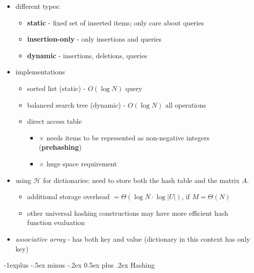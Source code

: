 \documentclass[10pt, landscape]{article}
\makeatletter
\renewcommand{\subsection}{\@startsection{subsection}{2}{0mm}%
  {-1explus -.5ex minus -.2ex}%
  {0.5ex plus .2ex}%
{\normalfont\normalsize\bfseries}}
\makeatother
\begin{document}
\begin{multicols*}{4}
  \begin{itemize}
    \item different types:
      \begin{itemize}
        \item \textbf{static} - fixed set of inserted items; only care about queries
        \item \textbf{insertion-only} - only insertions and queries
        \item \textbf{dynamic} - insertions, deletions, queries
      \end{itemize}
    \item implementations
      \begin{itemize}
        \item sorted list (static) - $O(\log N)$ query
        \item balanced search tree (dynamic) - $O(\log N)$ all operations
        \item direct access table
          \begin{itemize}
            \item $\times$ needs items to be represented as non-negative integers (\textbf{prehashing})
            \item $\times$ huge space requirement
          \end{itemize}
      \end{itemize}
    \item using $\mathcal{H}$ for dictionaries: need to store both the hash table and the matrix $A$.
      \begin{itemize}
        \item additional storage overhead $= \Theta(\log N \cdot \log \vert U \vert)$, if $M = \Theta(N)$
        \item other universal hashing constructions may have more efficient hash function evaluation
      \end{itemize}
    \item \textit{associative array} - has both key and value (dictionary in this context has only key)
  \end{itemize}

  \subsection{Hashing}


\end{multicols*}
\end{document}
